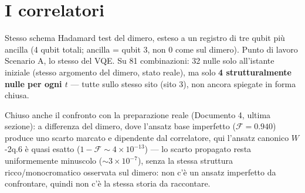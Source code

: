 \documentclass[11pt,a4paper]{article}
\begin{document}

\section{I correlatori}

Stesso schema Hadamard test del dimero, esteso a un registro di tre qubit
più ancilla (4 qubit totali; ancilla = qubit 3, non 0 come sul dimero).
Punto di lavoro Scenario A, lo stesso del VQE. Su 81 combinazioni: 32 nulle
solo all'istante iniziale (stesso argomento del dimero, stato reale), ma
solo \textbf{4 strutturalmente nulle per ogni $t$} --- tutte sullo stesso
sito (sito 3), non ancora spiegate in forma chiusa.

Chiuso anche il confronto con la preparazione reale (Documento 4, ultima
sezione): a differenza del dimero, dove l'ansatz base imperfetto
($\mathcal F=0.940$) produce uno scarto marcato e dipendente dal
correlatore, qui l'ansatz canonico $W$-2q.6 è quasi esatto
($1-\mathcal F\sim4\times10^{-13}$) --- lo scarto propagato resta
uniformemente minuscolo ($\sim3\times10^{-7}$), senza la stessa struttura
ricco/monocromatico osservata sul dimero: non c'è un ansatz imperfetto da
confrontare, quindi non c'è la stessa storia da raccontare.

\end{document}

